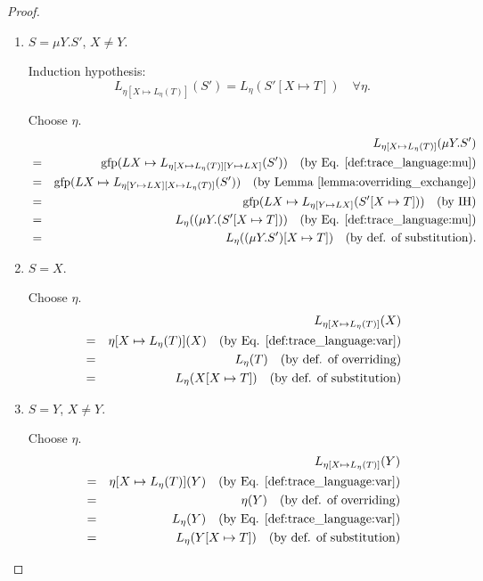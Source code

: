 \documentclass{llncs}
\newcommand*{\gfp}{\mathrm{gfp}}
\renewcommand*{\|}{\;|\;}
\begin{document}
\begin{proof}
\begin{enumerate}
    \item
      \label{case:substitution_trace_language:mu2}
      $S = \mu Y.S'$, $X \neq Y$.

      Induction hypothesis:
      \begin{equation*}
        L_{\eta[X \mapsto L_\eta(T)]}(S') = L_\eta(S'[X \mapsto T]) \quad \forall \eta.
      \end{equation*}

      Choose $\eta$.
      \begin{eqnarray*}
        &&  L_{\eta[X \mapsto L_\eta(T)]}(\mu Y.S') \\
        &=& \gfp(LX \mapsto L_{\eta[X \mapsto L_\eta(T)][Y \mapsto LX]}(S'))
            \quad \text{(by Eq. \ref{def:trace_language:mu})} \\
        &=& \gfp(LX \mapsto L_{\eta[Y \mapsto LX][X \mapsto L_\eta(T)]}(S'))
            \quad \text{(by Lemma \ref{lemma:overriding_exchange})} \\
        &=& \gfp(LX \mapsto L_{\eta[Y \mapsto LX]}(S'[X \mapsto T]))
            \quad \text{(by IH)} \\
        &=& L_\eta((\mu Y.(S'[X \mapsto T]))
            \quad \text{(by Eq. \ref{def:trace_language:mu})} \\
        &=& L_\eta((\mu Y.S')[X \mapsto T])
            \quad \text{(by def. of substitution)}. \\
      \end{eqnarray*}

    \item
      \label{case:substitution_trace_language:var1}
      $S = X$.

      Choose $\eta$.
      \begin{eqnarray*}
        &&  L_{\eta[X \mapsto L_\eta(T)]}(X) \\
        &=& \eta[X \mapsto L_\eta(T)](X)
            \quad \text{(by Eq. \ref{def:trace_language:var})} \\
        &=& L_\eta(T)
            \quad \text{(by def. of overriding)} \\
        &=& L_\eta(X[X \mapsto T])
            \quad \text{(by def. of substitution)}
      \end{eqnarray*}

    \item
      \label{case:substitution_trace_language:var2}
      $S = Y$, $X \neq Y$.

      Choose $\eta$.
      \begin{eqnarray*}
        &&  L_{\eta[X \mapsto L_\eta(T)]}(Y) \\
        &=& \eta[X \mapsto L_\eta(T)](Y)
            \quad \text{(by Eq. \ref{def:trace_language:var})} \\
        &=& \eta(Y)
            \quad \text{(by def. of overriding)} \\
        &=& L_\eta(Y)
            \quad \text{(by Eq. \ref{def:trace_language:var})} \\
        &=& L_\eta(Y[X \mapsto T])
            \quad \text{(by def. of substitution)}
      \end{eqnarray*}


\end{enumerate}
\end{proof}
\end{document}
